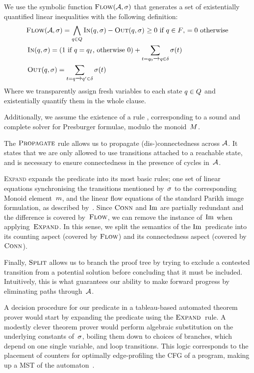 \documentclass[acmsmall,review,anonymous]{acmart}\settopmatter{printfolios=true,printccs=false,printacmref=true}
\theoremstyle{definition}
\begin{document}
We use the symbolic function $\textsc{Flow}(\mathcal{A}, \operatorname{\sigma})$ that generates a set
of existentially quantified linear inequalities with the following definition:
$$
\begin{aligned}
  & \textsc{Flow}(\mathcal{A}, \operatorname{\sigma}) = \bigwedge_{q \in Q} \operatorname{\textsc{In}}(q, \operatorname{\sigma}) - \operatorname{\textsc{Out}}(q, \operatorname{\sigma})
\text{ $\geq 0$ if $q \in F$, $= 0$ otherwise}\\
  & \operatorname{\textsc{In}}(q, \operatorname{\sigma}) = \left(\text{$1$ if $q = q_I$, otherwise $0$}\right) + \sum_{t = q_0 \xrightarrow{} q \in \delta} \operatorname{\sigma}(t)\\
  & \operatorname{\textsc{Out}}(q, \operatorname{\sigma}) = \sum_{t = q \xrightarrow{} q' \in \delta} \operatorname{\sigma}(t)
\end{aligned}
$$
Where we transparently assign fresh variables to each state $q \in Q$
and existentially quantify them in the whole clause. 

Additionally, we assume the existence of a rule \PresburgerClose{},
corresponding to a sound and complete solver for Presburger formulae, modulo the
monoid~$M$.

The $\textsc{Propagate}{}$ rule allows us to propagate (dis-)connectedness across
$\mathcal{A}$. It states that we are only allowed to use transitions attached to
a reachable state, and is necessary to ensure connectedness in the presence of
cycles in~$\mathcal{A}$.

\textsc{Expand} expands the predicate into its most basic rules; one set of
linear equations synchronising the transitions mentioned by~$\operatorname{\sigma}$ to the
corresponding Monoid element~$m$, and the linear flow equations of
the standard Parikh image formulation, as described by~\FlowEq. Since
$\operatorname{\textsc{Conn}}$ and $\operatorname{Im}$ are partially redundant and the difference is covered
by~$\textsc{Flow}$, we can remove the instance of~$\operatorname{Im}$ when applying~$\textsc{Expand}$. In
this sense, we split the semantics of the $\operatorname{Im}$~predicate into its counting
aspect (covered by $\textsc{Flow}$) and its connectedness aspect (covered by
$\operatorname{\textsc{Conn}}$).

Finally, $\textsc{Split}{}$ allows us to branch the proof tree by trying to exclude a
contested transition from a potential solution before concluding that it must be
included. Intuitively, this is what guarantees our ability to make forward
progress by eliminating paths through~$\mathcal{A}$.

A decision procedure for our predicate in a tableau-based automated theorem
prover would start by expanding the predicate using the $\textsc{Expand}{}$~rule. A
modestly clever theorem prover would perform algebraic substitution on the
underlying constants of~$\operatorname{\sigma}$, boiling them down to choices of branches,
which depend on one single variable, and loop transitions. This logic
corresponds to the placement of counters for optimally edge-profiling the CFG of
a program, making up a MST of the automaton~\cite{path-profiling}.
\end{document}
